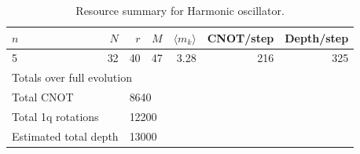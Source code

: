 \begin{table}[t]
\centering
\caption{Resource summary for Harmonic oscillator.}
\label{tab:resources_harmonic_oscillator}
\begin{tabular}{lrrrrrr}
\toprule
$n$ & $N$ & $r$ & $M$ & $\langle m_k\rangle$ & CNOT/step & Depth/step \\
\midrule
5 & 32 & 40 & 47 & 3.28 & 216 & 325 \\
\midrule
\multicolumn{4}{l}{Totals over full evolution} & & & \\
\multicolumn{2}{l}{Total CNOT} & \multicolumn{5}{l}{8640} \\
\multicolumn{2}{l}{Total 1q rotations} & \multicolumn{5}{l}{12200} \\
\multicolumn{2}{l}{Estimated total depth} & \multicolumn{5}{l}{13000} \\
\bottomrule
\end{tabular}
\end{table}
